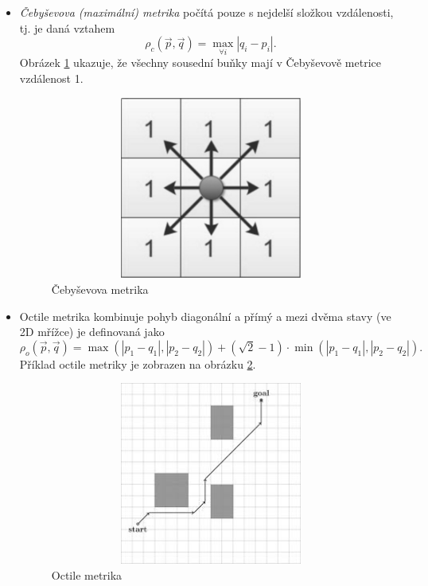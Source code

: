 \begin{itemize}
	\item \emph{Čebyševova (maximální) metrika} počítá pouze s nejdelší složkou vzdálenosti, tj. je daná vztahem
	\begin{equation}
	\rho_c\left(\vec{p},\vec{q}\right)=\max_{\forall i}\left|q_i-p_i\right|.
	\end{equation}
	Obrázek \ref{obr:chebyshev} ukazuje, že všechny sousední buňky mají v Čebyševově metrice vzdálenost 1.
	
	\begin{figure}[htb]
		\begin{center}
			\includegraphics*[width=15cm,height=6cm,keepaspectratio]{obr/chebyshev}
		\end{center}
		\caption{Čebyševova metrika}
		\label{obr:chebyshev}
	\end{figure}
	
	\item Octile metrika kombinuje pohyb  diagonální a přímý a mezi dvěma stavy (ve 2D mřížce) je definovaná jako
	\begin{equation} \rho_o\left(\vec{p},\vec{q}\right)=\max\left(\left|p_1-q_1\right|,\left|p_2-q_2\right|\right)+(\sqrt{2}-1)\cdot \min\left(\left|p_1-q_1\right|,\left|p_2-q_2\right|\right).
	\end{equation}
	Příklad octile metriky je zobrazen na obrázku \ref{obr:octile}.
	
	\begin{figure}[htb]
		\begin{center}
			\includegraphics*[width=15cm,height=6cm,keepaspectratio]{obr/octile}
		\end{center}
		\caption{Octile metrika}
		\label{obr:octile}
	\end{figure}
	
\end{itemize} 
